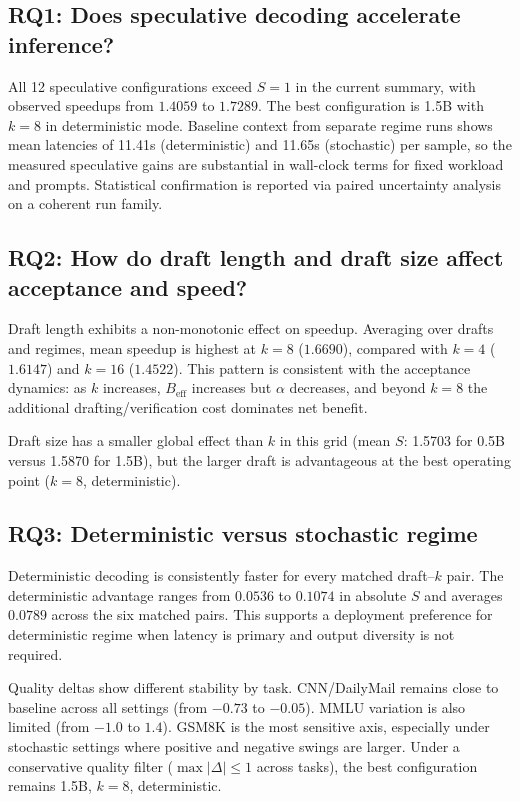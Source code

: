 \subsection{RQ1: Does speculative decoding accelerate inference?}

All 12 speculative configurations exceed $S{=}1$ in the current summary,
with observed speedups
from $1.4059$ to $1.7289$. The best configuration is 1.5B with $k{=}8$ in
deterministic mode. Baseline context from separate regime runs shows mean
latencies of 11.41s (deterministic) and 11.65s (stochastic) per sample, so the
measured speculative gains are substantial in wall-clock terms for fixed
workload and prompts. Statistical confirmation is reported via paired
uncertainty analysis on a coherent run family.

\subsection{RQ2: How do draft length and draft size affect acceptance and speed?}

Draft length exhibits a non-monotonic effect on speedup. Averaging over drafts
and regimes, mean speedup is highest at $k{=}8$ ($1.6690$), compared with
$k{=}4$ ($1.6147$) and $k{=}16$ ($1.4522$). This pattern is consistent with the
acceptance dynamics: as $k$ increases, $B_{\text{eff}}$ increases but
$\alpha$ decreases, and beyond $k{=}8$ the additional drafting/verification cost
dominates net benefit.

Draft size has a smaller global effect than $k$ in this grid
(mean $S$: 1.5703 for 0.5B versus 1.5870 for 1.5B), but the larger draft is
advantageous at the best operating point ($k{=}8$, deterministic).

\subsection{RQ3: Deterministic versus stochastic regime}

Deterministic decoding is consistently faster for every matched draft--$k$
pair. The deterministic advantage ranges from $0.0536$ to $0.1074$ in absolute
$S$ and averages $0.0789$ across the six matched pairs. This supports a
deployment preference for deterministic regime when latency is primary and
output diversity is not required.

Quality deltas show different stability by task. CNN/DailyMail remains close to
baseline across all settings (from $-0.73$ to $-0.05$). MMLU variation is also
limited (from $-1.0$ to $1.4$). GSM8K is the most sensitive axis, especially
under stochastic settings where positive and negative swings are larger. Under
a conservative quality filter ($\max |\Delta| \le 1$ across tasks), the best
configuration remains 1.5B, $k{=}8$, deterministic.

